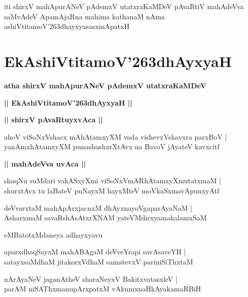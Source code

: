 \documentclass[twoside,12pt,openright]{book}
\def\S{\char'263}
\newcounter{shloka}[chapter]
\def\uvaca#1{\centerline{{\large\textbf{#1}}}}
\begin{document}
\begin{center}
iti shirxV mahApurANeV pAdemxV utatxraKaMDeV pAvaRtiV mahAdeVva saMvAdeV ApamAjaRna mahima kathanaM 
nAma ashiVtitamoV\S dhayxyasasxmApatxH 
\end{center}

\chapter{EkAshiVtitamoV\S dhAyxyaH}

\begin{center}
{\LARGE\bfseries atha shirxV mahApurANeV pAdemxV utatxraKaMDeV}
\end{center}

\begin{center}
{\LARGE\bfseries || EkAshiVtitamoV\S dhAyxyaH || }
\end{center}

\uvaca{|| shirxV pAvaRtuyxvAca ||}

\begin{shloka}%
ahoV viSoNxVshacx mAhAtamxyXM vada vishevxVshavxra parxBoV |\\
yanAmxhAtamxyXM punashushxrXtAvx na BavoV jAyateV kavxcitf
\end{shloka}

\uvaca{|| mahAdeVva uvAca ||}

\begin{shloka}%
shaqNu suMdari vakASxyXmi viSoNxVmARhAtamxyXmutatxmaM |\\
shurxtAvx tu laBateV puNayxM hayxMteV moVkaSxmavApunxyAtf 
\end{shloka}

\begin{shloka}%
deVvarxtaM mahApArxjacnxM dhAyxnayoVgaparAyaNaM |\\
AsharxmaM savaRshAsAtxrXNAM yateVMdirxyamakalamxSaM 
\end{shloka}

\begin{center}
eMBatotxMdaneya adhayxyavu
\end{center}

\begin{shloka}%
aparxdhaqSayxM mahABAgaM deVveYrapi savAsaveYH |\\
satayxsaMdhaM jitakorxVdhaM samatevxV pariniSiThxtaM 
\end{shloka}

\begin{shloka}%
nArAyaNeV jaganAtheV sharaNeyxV BakitxvatasxleV |\\
parAM niSAThxmanupArxpatxM vAknmxnaHkAyakamaRBiH
\end{shloka}
\end{document}
